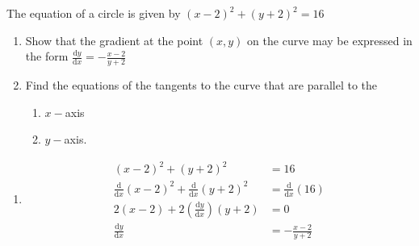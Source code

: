 \documentclass[11pt,a4paper]{book}
\begin{document}
\begin{example}

The equation of a circle is given by $\left(x-2\right)^{2}+\left(y+2\right)^{2}=16$
\begin{enumerate}[label=(\alph*)]
\item Show that the gradient at the point $\left(x,y\right)$ on the curve may be expressed in the form ${\displaystyle \frac{\mathrm{d}y}{\mathrm{d}x}=-\frac{x-2}{y+2}}$
\item Find the equations of the tangents to the curve that are parallel to the
\begin{enumerate}[label=(\roman*)]
\item $x-$axis
\item $y-$axis.
\end{enumerate}
\end{enumerate}

\Solution

\begin{enumerate}[label=(\alph*)]

\item \begin{align*}
\left(x-2\right)^{2}+\left(y+2\right)^{2} & =16 \tag{1}\\
 \frac{\mathrm{d}}{\mathrm{d}x}\left(x-2\right)^{2}+\frac{\mathrm{d}}{\mathrm{d}x}\left(y+2\right)^{2} & =\frac{\mathrm{d}}{\mathrm{d}x}(16) \\
 2\left(x-2\right)+2\left(\frac{\mathrm{d}y}{\mathrm{d}x}\right)\left(y+2\right) & =0 \\
  \frac{\mathrm{d}y}{\mathrm{d}x} & =-\frac{x-2}{y+2}
\end{align*}


\end{enumerate}
\end{example}
\end{document}
